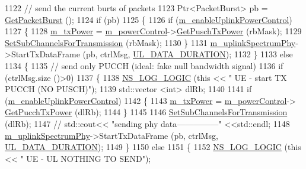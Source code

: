 \begin{DoxyCode}
1122       \textcolor{comment}{// send the current burts of packets}
1123       Ptr<PacketBurst> pb = \hyperlink{classns3_1_1LtePhy_a832e7a5c99c59e5ee23cbd6e748400e0}{GetPacketBurst} ();
1124       \textcolor{keywordflow}{if} (pb)
1125         \{
1126           \textcolor{keywordflow}{if} (\hyperlink{classns3_1_1LteUePhy_a894d55731114732593b7d7eef8cb94b2}{m\_enableUplinkPowerControl})
1127             \{
1128               \hyperlink{classns3_1_1LtePhy_a09eff916f067eab2f7bf4f7b5f7f2750}{m\_txPower} = \hyperlink{classns3_1_1LteUePhy_a60d8441e8e06f624019df3ab9c9c6dec}{m\_powerControl}->\hyperlink{classns3_1_1LteUePowerControl_acfc4ff4ef22f8f408ba02cb38122f957}{GetPuschTxPower} (rbMask);
1129               \hyperlink{classns3_1_1LteUePhy_a0b004ef45d225a8cf75647db08aeab9b}{SetSubChannelsForTransmission} (rbMask);
1130             \}
1131           \hyperlink{classns3_1_1LtePhy_addc3110b5a1f7b63c52f4ce8ca59c6cd}{m\_uplinkSpectrumPhy}->StartTxDataFrame (pb, ctrlMsg, 
      \hyperlink{namespacens3_a55e73a4f68b7fd8e7e343507882a0c05}{UL\_DATA\_DURATION});
1132         \}
1133       \textcolor{keywordflow}{else}
1134         \{
1135           \textcolor{comment}{// send only PUCCH (ideal: fake null bandwidth signal)}
1136           \textcolor{keywordflow}{if} (ctrlMsg.size ()>0)
1137             \{
1138               \hyperlink{group__logging_ga88acd260151caf2db9c0fc84997f45ce}{NS\_LOG\_LOGIC} (\textcolor{keyword}{this} << \textcolor{stringliteral}{" UE - start TX PUCCH (NO PUSCH)"});
1139               std::vector <int> dlRb;
1140 
1141               \textcolor{keywordflow}{if} (\hyperlink{classns3_1_1LteUePhy_a894d55731114732593b7d7eef8cb94b2}{m\_enableUplinkPowerControl})
1142                 \{
1143                   \hyperlink{classns3_1_1LtePhy_a09eff916f067eab2f7bf4f7b5f7f2750}{m\_txPower} = \hyperlink{classns3_1_1LteUePhy_a60d8441e8e06f624019df3ab9c9c6dec}{m\_powerControl}->
      \hyperlink{classns3_1_1LteUePowerControl_a8d592c40dcedb94e7db3978e7c876fa2}{GetPucchTxPower} (dlRb);
1144                 \}
1145 
1146               \hyperlink{classns3_1_1LteUePhy_a0b004ef45d225a8cf75647db08aeab9b}{SetSubChannelsForTransmission} (dlRb);
1147            \textcolor{comment}{//   std::cout<< "sending phy data---------------" <<std::endl;}
1148               \hyperlink{classns3_1_1LtePhy_addc3110b5a1f7b63c52f4ce8ca59c6cd}{m\_uplinkSpectrumPhy}->StartTxDataFrame (pb, ctrlMsg, 
      \hyperlink{namespacens3_a55e73a4f68b7fd8e7e343507882a0c05}{UL\_DATA\_DURATION});
1149             \}
1150           \textcolor{keywordflow}{else}
1151             \{
1152               \hyperlink{group__logging_ga88acd260151caf2db9c0fc84997f45ce}{NS\_LOG\_LOGIC} (\textcolor{keyword}{this} << \textcolor{stringliteral}{" UE - UL NOTHING TO SEND"});

\end{DoxyCode}

